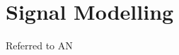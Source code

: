 \section{Signal Modelling}
\label{sec:signalmodelling}

Referred to AN \cite{CMS-PAS-HIG-19-001}

%
%
%
%
%
%
%
